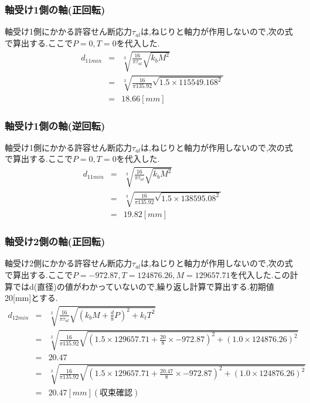 \documentclass[a4j,twoside,openright,11pt]{jreport}
\begin{document}
\subsubsection{軸受け1側の軸(正回転)}
軸受け1側にかかる許容せん断応力$\tau_{al}$は,ねじりと軸力が作用しないので,次の式で算出する.ここで$P=0,T=0$を代入した.
\begin{eqnarray}
d_{11min} &=& \sqrt [3]{ \frac{16}{\pi \tau_{al}}\sqrt{k_bM^2} }\\
       &=& \sqrt [3]{ \frac{16}{\pi 135.92}\sqrt{1.5 \times 115549.168^2} }\\
       &=& 18.66[mm]
\end{eqnarray}
\subsubsection{軸受け1側の軸(逆回転)}
軸受け1側にかかる許容せん断応力$\tau_{al}$は,ねじりと軸力が作用しないので,次の式で算出する.ここで$P=0,T=0$を代入した.
\begin{eqnarray}
d_{11min} &=& \sqrt [3]{ \frac{16}{\pi \tau_{al}}\sqrt{k_bM^2} }\\
       &=& \sqrt [3]{ \frac{16}{\pi 135.92}\sqrt{1.5 \times 138595.08^2} }\\
       &=& 19.82[mm]
\end{eqnarray}
\subsubsection{軸受け2側の軸(正回転)}
軸受け2側にかかる許容せん断応力$\tau_{al}$は,ねじりと軸力が作用しないので,次の式で算出する.ここで$P=-972.87,T=124876.26, M=129657.71$を代入した.この計算ではd(直径)の値がわかっていないので,繰り返し計算で算出する.初期値20[mm]とする.
\begin{eqnarray}
d_{12min}&=& \sqrt [3]{ \frac{16}{\pi \tau_{al}}\sqrt{(k_bM+\frac{d}{8}P)^2+k_tT^2} }\\
       &=& \sqrt [3]{ \frac{16}{\pi 135.92} \sqrt{(1.5 \times 129657.71 +\frac{20}{8}\times -972.87)^2+(1.0 \times 124876.26)^2} }\\
       &=&20.47\\
       &=& \sqrt [3]{ \frac{16}{\pi 135.92} \sqrt{(1.5 \times 129657.71 +\frac{20.47}{8}\times -972.87)^2+(1.0 \times 124876.26)^2} }\\
       &=&20.47[mm](収束確認)
\end{eqnarray}
\end{document}

